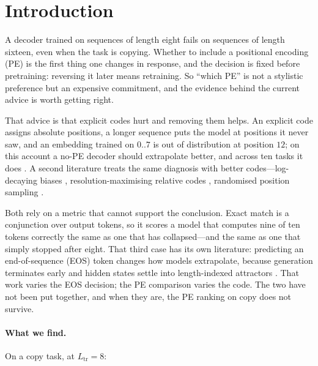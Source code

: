 \section{Introduction}
\label{sec:intro}

A decoder trained on sequences of length eight fails on sequences of length
sixteen, even when the task is copying. Whether to include a positional encoding
(PE) is the first thing one changes in response, and the decision is fixed before
pretraining: reversing it later means retraining. So ``which PE'' is not a
stylistic preference but an expensive commitment, and the evidence behind the
current advice is worth getting right.

That advice is that explicit codes hurt and removing them helps. An explicit code
assigns absolute positions, a longer sequence puts the model at positions it never
saw, and an embedding trained on $0..7$ is out of distribution at position $12$;
on this account a no-PE decoder should extrapolate better, and across ten tasks it
does \citep{kazemnejad2023impact}. A second literature treats the same diagnosis
with better codes---log-decaying biases \citep{chi2023dissecting},
resolution-maximising relative codes \citep{sun2023length}, randomised position
sampling \citep{ruoss2023randomized}.

Both rely on a metric that cannot support the conclusion. Exact match is a
conjunction over output tokens, so it scores a model that computes nine of ten
tokens correctly the same as one that has collapsed---and the same as one that
simply stopped after eight. That third case has its own literature: predicting an
end-of-sequence (EOS) token changes how models extrapolate, because generation
terminates early and hidden states settle into length-indexed attractors
\citep{newman2020eos}. That work varies the EOS decision; the PE comparison varies
the code. The two have not been put together, and when they are, the PE ranking on
copy does not survive.



\paragraph{What we find.} On a copy task, at $L_{\mathrm{tr}}{=}8$:

